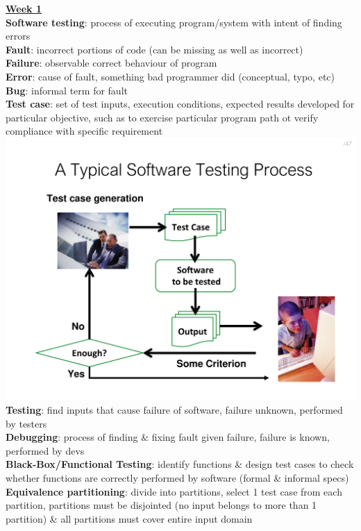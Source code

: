 \documentclass[a4paper]{article}
\begin{document}
    \begin{multicols}{3}
        \noindent\underline{\textbf{Week 1}}\\
        \textbf{Software testing}: process of executing program/system with intent of finding errors\\
        \textbf{Fault}: incorrect portions of code (can be missing as well as incorrect)\\
        \textbf{Failure}: observable correct behaviour of program\\
        \textbf{Error}: cause of fault, something bad programmer did (conceptual, typo, etc)\\
        \textbf{Bug}: informal term for fault\\
        \textbf{Test case}: set of test inputs, execution conditions, expected results developed for particular objective, such as to exercise particular program path ot verify compliance with specific requirement\\
        \includegraphics[width=\linewidth]{22.pdf}\\
        \textbf{Testing}: find inputs that cause failure of software, failure unknown, performed by testers\\
        \textbf{Debugging}: process of finding \& fixing fault given failure, failure is known, performed by devs\\
        \textbf{Black-Box/Functional Testing}: identify functions \& design test cases to check whether functions are correctly performed by software (formal \& informal specs)\\
        \textbf{Equivalence partitioning}: divide into partitions, select 1 test case from each partition, partitions must be disjointed (no input belongs to more than 1 partition) \& all partitions must cover entire input domain\\

\end{multicols}
\end{document}
